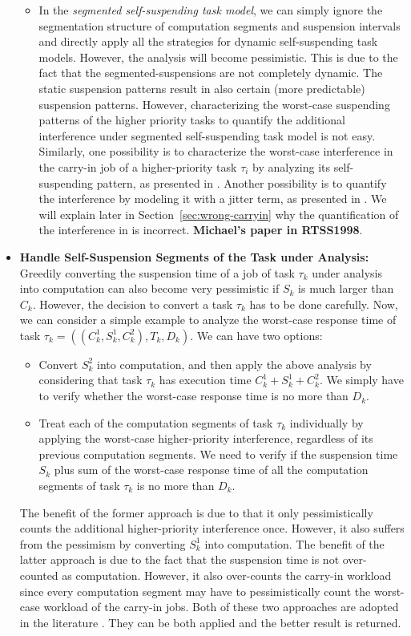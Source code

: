 \begin{itemize}
\begin{itemize}
\item In the \emph{segmented self-suspending task model}, we can simply ignore the segmentation structure of computation segments and suspension intervals and directly apply all the strategies for dynamic self-suspending task models. However, the analysis will become pessimistic. This is due to the fact that the segmented-suspensions are not completely dynamic. The static suspension patterns result in also certain (more predictable) suspension patterns. However, characterizing the worst-case suspending patterns of the higher priority tasks to quantify the additional interference under segmented self-suspending task model is not easy. Similarly, one possibility is to characterize the worst-case interference in the carry-in job of a higher-priority task $\tau_i$ by analyzing its self-suspending pattern, as presented in \cite{Huang:multiseg}. Another possibility is to  quantify the interference by modeling it with a jitter term, as presented in \cite{RTCSA-BletsasA05}. We will explain later in Section~\ref{sec:wrong-carryin} why the quantification of the interference in \cite{RTCSA-BletsasA05} is incorrect. {\bf Michael's paper in RTSS1998}.
\end{itemize}

\item {\bf Handle Self-Suspension Segments of the Task under Analysis:} Greedily converting the suspension time of a job of task $\tau_k$ under analysis into computation can also become very pessimistic if $S_k$ is much larger than $C_k$. However, the decision to convert a task $\tau_k$ has to be done carefully. Now, we can consider a simple example to analyze the worst-case response time of task $\tau_k = ((C_k^1, S_k^1, C_k^2), T_k, D_k)$. We can have two options:
\begin{itemize}
\item Convert $S_k^2$ into computation, and then apply the above analysis by considering that task $\tau_k$ has execution time $C_k^1+S_k^1+C_k^2$. We simply have to verify whether the worst-case response time is no more than $D_k$.
\item Treat each of the computation segments of task $\tau_k$ individually by applying the worst-case higher-priority interference, regardless of its previous computation segments. We need to verify if the suspension time $S_k$ plus sum of the worst-case response time of all the computation segments of task $\tau_k$ is no more than $D_k$. 
\end{itemize}
The benefit of the former approach is due to that it only pessimistically counts the additional higher-priority interference once. However, it also suffers from the pessimism by converting $S_k^1$ into computation. The benefit of the latter approach is due to the fact that the suspension time is not over-counted as computation. However, it also over-counts the carry-in workload since every computation segment may have to pessimistically count the worst-case workload of the carry-in jobs. Both of these two approaches are adopted in the literature \cite{ecrts15nelissen,Huang:multiseg,RTCSA-BletsasA05}. They can be both applied and the better result is returned.


\end{itemize}
